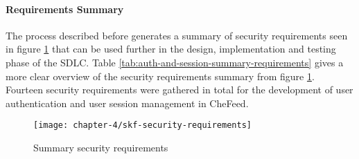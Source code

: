 \paragraph{Requirements Summary}
The process described before generates a summary of security requirements seen in figure \ref{fig:summary-requirements} that can be used further in the design, implementation and testing phase of the SDLC. Table \ref{tab:auth-and-session-summary-requirements} gives a more clear overview of the security requirements summary from figure \ref{fig:summary-requirements}. Fourteen security requirements were gathered in total for the development of user authentication and user session management in CheFeed.

\begin{figure}
    \centering
    \texttt{[image: chapter-4/skf-security-requirements]}
    \caption{Summary security requirements}
    \label{fig:summary-requirements}
\end{figure}

